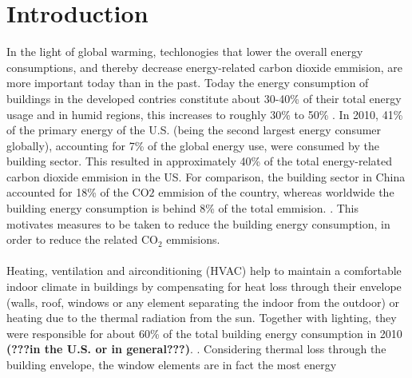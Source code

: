 \section{Introduction}
In the light of global warming, techlonogies that lower the overall energy consumptions, and thereby
decrease
energy-related carbon dioxide emmision, are more important today than in the past. 
Today the energy consumption of buildings in the developed contries constitute about 30-40\%
of their total energy usage and in humid regions, this increases to roughly 30\% to 50\% \cite{AlRabghi2001}\cite{Wilde2004}\cite{Kwak2010}. 
In 2010, 41\% of the primary energy
of the U.S. (being the second largest energy consumer globally), accounting for 7\% of the global energy use,
were consumed by the building sector.
This resulted in approximately 40\% of the total energy-related carbon dioxide emmision in the US. 
For comparison, the building sector in China accounted for 18\% of the CO$2$ emmision of the country, 
whereas worldwide the building energy consumption is behind 8\% of the total emmision.
\cite{buildingsEnergyDatabook}\cite{Hong2009}.
This motivates measures to be taken to reduce the building energy consumption, in order to reduce the 
related CO$_2$ emmisions.
\\
\\
Heating, ventilation and airconditioning (HVAC) help to maintain a comfortable indoor climate in buildings by
compensating for heat loss through their envelope (walls, roof, windows or any element separating
the indoor from the outdoor) or heating due to the thermal radiation from the sun.
Together with lighting, they were responsible for about 60\% of the total building energy consumption 
in 2010
\textbf{(???in the U.S. or in general???)}.
\cite{buildingsEnergyDatabook}. 
Considering thermal loss through the building 
envelope, the window elements are in fact the most energy 
%
